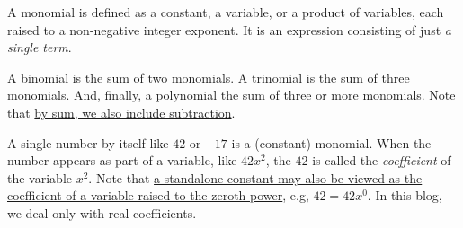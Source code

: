 \documentclass[
  a4paper,
]{article}
\begin{document}
A monomial is defined as a constant, a variable, or a product of
variables, each raised to a non-negative integer exponent. It is an
expression consisting of just \emph{a single term}.

A binomial is the sum of two monomials. A trinomial is the sum of three
monomials. And, finally, a polynomial the sum of three or more
monomials. Note that
\href{https://swanlotus.netlify.app/blogs/the-two-most-important-numbers-zero-and-one}{by
sum, we also include subtraction}.

A single number by itself like \(42\) or \(-17\) is a (constant)
monomial. When the number appears as part of a variable, like \(42x^2\),
the \(42\) is called the \emph{coefficient} of the variable \(x^2\).
Note that
\href{https://swanlotus.netlify.app/blogs/the-two-most-important-numbers-zero-and-one}{a
standalone constant may also be viewed as the coefficient of a variable
raised to the zeroth power}, e.g, \(42 = 42x^{0}\). In this blog, we
deal only with real coefficients.
\end{document}
